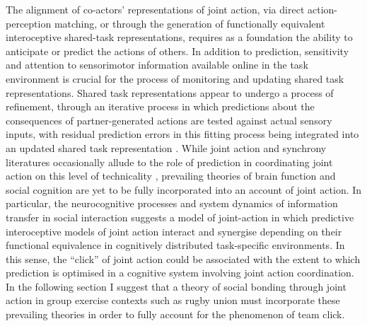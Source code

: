 The alignment of co-actors' representations of joint action, via direct action-perception matching, or through the generation of functionally equivalent interoceptive shared-task representations, requires as a foundation the ability to anticipate or predict the actions of others.  In addition to prediction, sensitivity and attention to sensorimotor information available online in the task environment is crucial for the process of monitoring and updating shared task representations. Shared task representations appear to undergo a process of refinement, through an iterative process in which predictions about the consequences of partner-generated actions are tested against actual sensory inputs, with residual prediction errors in this fitting process being integrated into an updated shared task representation \citep{Vesper2016}. While joint action and synchrony literatures occasionally allude to the role of prediction in coordinating joint action on this level of technicality \citep[see for example][]{Sebanz2009,Glover2017}, prevailing theories of brain function and social cognition are yet to be fully incorporated into an account of joint action.  In particular, the neurocognitive processes and system dynamics of information transfer in social interaction suggests a model of joint-action in which predictive interoceptive models of joint action interact and synergise depending on their functional equivalence in cognitively distributed task-specific environments. In this sense, the ``click'' of joint action could be associated with the extent to which prediction is optimised in a cognitive system involving joint action coordination.  In the following section I suggest that a theory of social bonding through joint action in group exercise contexts such as rugby union must incorporate these prevailing theories in order to fully account for the phenomenon of team click.

\clearpage



